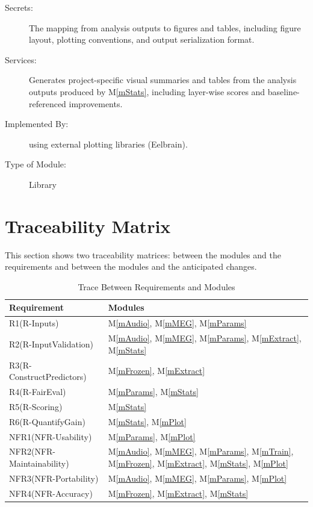 \documentclass[12pt, titlepage]{article}
\newcommand{\mref}[1]{M\ref{#1}}
\begin{document}
\begin{description}
\item[Secrets:] The mapping from analysis outputs to figures and tables,
including figure layout, plotting conventions, and output serialization format.
\item[Services:] Generates project-specific visual summaries and tables from the analysis outputs produced by \mref{mStats}, including layer-wise scores and baseline-referenced improvements.
\item[Implemented By:] \progname{} using external plotting libraries (Eelbrain).
\item[Type of Module:] Library
\end{description}







\section{Traceability Matrix} \label{SecTM}

This section shows two traceability matrices: between the modules and the
requirements and between the modules and the anticipated changes.

\begin{table}[H]
\centering
\begin{tabular}{p{} p{}}
\toprule
\textbf{Requirement} & \textbf{Modules}\\
\midrule
R1(R-Inputs) & \mref{mAudio}, \mref{mMEG}, \mref{mParams}\\
R2(R-InputValidation) & \mref{mAudio}, \mref{mMEG}, \mref{mParams}, \mref{mExtract}, \mref{mStats}\\
R3(R-ConstructPredictors) & \mref{mFrozen}, \mref{mExtract}\\
R4(R-FairEval) & \mref{mParams}, \mref{mStats}\\
R5(R-Scoring) & \mref{mStats}\\
R6(R-QuantifyGain) & \mref{mStats}, \mref{mPlot}\\
NFR1(NFR-Usability) & \mref{mParams}, \mref{mPlot}\\
NFR2(NFR-Maintainability) & \mref{mAudio}, \mref{mMEG}, \mref{mParams}, \mref{mTrain}, \mref{mFrozen}, \mref{mExtract}, \mref{mStats}, \mref{mPlot}\\
NFR3(NFR-Portability) & \mref{mAudio}, \mref{mMEG}, \mref{mParams}, \mref{mPlot}\\
NFR4(NFR-Accuracy) & \mref{mFrozen}, \mref{mExtract}, \mref{mStats}\\
\bottomrule
\end{tabular}
\caption{Trace Between Requirements and Modules}
\label{TblRT}
\end{table}
\end{document}

